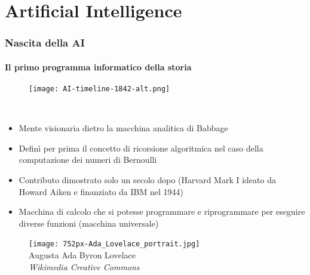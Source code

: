 \section{Artificial Intelligence} %
\label{sec:ai}
%
\begin{frame}[t,fragile] \frametitle{Nascita della AI}
	{\scriptsize
		\onslide<1->
            \framesubtitle{Il primo programma informatico della storia}
            \vspace*{-15pt}
             \begin{minipage}[t]{\textwidth}
             	\begin{figure}[ht]
                    \centering
                    \texttt{[image: AI-timeline-1842-alt.png]}
                \end{figure}
            \end{minipage}
            \\\vspace*{3pt}
	    	\begin{minipage}[t]{\textwidth}
				\begin{minipage}[t]{0.6\textwidth}
	    			\begin{itemize}[leftmargin=10pt,align=right]
						\onslide<2->\item[\alert{\faHandORight}] Mente visionaria dietro la \alert{macchina analitica di Babbage}
						\onslide<3->\item[\alert{\faHandORight}] Definì per prima il concetto di \alert{ricorsione algoritmica} nel caso della computazione dei numeri di Bernoulli
						\onslide<4->\item[\alert{\faHandORight}] Contributo dimostrato solo un secolo dopo (Harvard Mark I ideato da Howard Aiken e finanziato da IBM nel 1944)
						\onslide<5->\item[\alert{\faHandORight}] Macchina di calcolo che si potesse programmare e riprogrammare per eseguire diverse funzioni (\alert{macchina universale})
					\end{itemize}
            	\end{minipage}
            	\begin{minipage}[t]{0.4\textwidth}
                	\centering
                	\begin{figure}[ht]
                    	\texttt{[image: 752px-Ada\_Lovelace\_portrait.jpg]}
                    	{\tiny\\Augusta Ada Byron Lovelace\\\vspace*{-1pt}\textit{\textcopyright Wikimedia Creative Commons}}
                	\end{figure}
            	\end{minipage}
	    	\end{minipage}
	}
\end{frame}
